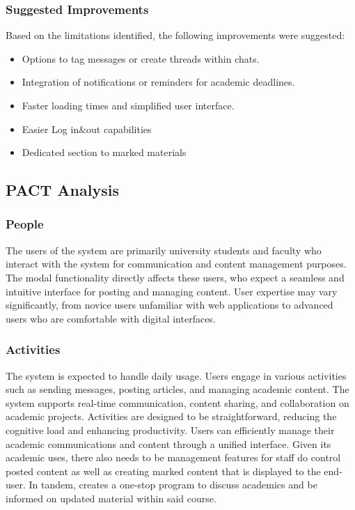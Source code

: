\documentclass[12pt,a4paper]{article}
\begin{document}
\subsubsection*{Suggested Improvements}
Based on the limitations identified, the following improvements were suggested:
\begin{itemize}
    \item Options to tag messages or create threads within chats.
    \item Integration of notifications or reminders for academic deadlines.
    \item Faster loading times and simplified user interface.
    \item Easier Log in\&out capabilities
    \item Dedicated section to marked materials
\end{itemize}

\subsection*{PACT Analysis}

\subsubsection*{People}
The users of the system are primarily university students and faculty who interact with the system for communication and content management purposes. The modal functionality directly affects these users, who expect a seamless and intuitive interface for posting and managing content. User expertise may vary significantly, from novice users unfamiliar with web applications to advanced users who are comfortable with digital interfaces.

\subsubsection*{Activities}
 The system is expected to handle daily usage. Users engage in various activities such as sending messages, posting articles, and managing academic content. The system supports real-time communication, content sharing, and collaboration on academic projects. Activities are designed to be straightforward, reducing the cognitive load and enhancing productivity. Users can efficiently manage their academic communications and content through a unified interface. Given its academic uses, there also needs to be management features for staff do control posted content as well as creating marked content that is displayed to the end-user. In tandem, creates a one-stop program to discuss academics and be informed on updated material within said course.
\end{document}
